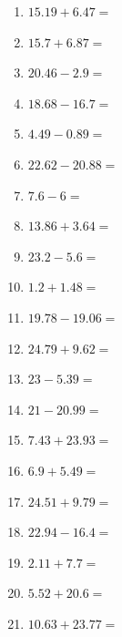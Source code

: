 \documentclass[12pt]{article}
\begin{document}
\begin{enumerate}
\item \large $ 15.19 + 6.47 = $ \vspace{1.5cm}
\newpage
\item \large $ 15.7 + 6.87 = $ \vspace{1.5cm}
\item \large $ 20.46 - 2.9 = $ \vspace{1.5cm}
\item \large $ 18.68 - 16.7 = $ \vspace{1.5cm}
\item \large $ 4.49 - 0.89 = $ \vspace{1.5cm}
\item \large $ 22.62 - 20.88 = $ \vspace{1.5cm}
\item \large $ 7.6 - 6 = $ \vspace{1.5cm}
\item \large $ 13.86 + 3.64 = $ \vspace{1.5cm}
\item \large $ 23.2 - 5.6 = $ \vspace{1.5cm}
\item \large $ 1.2 + 1.48 = $ \vspace{1.5cm}
\item \large $ 19.78 - 19.06 = $ \vspace{1.5cm}
\newpage
\item \large $ 24.79 + 9.62 = $ \vspace{1.5cm}
\item \large $ 23 - 5.39 = $ \vspace{1.5cm}
\item \large $ 21 - 20.99 = $ \vspace{1.5cm}
\item \large $ 7.43 + 23.93 = $ \vspace{1.5cm}
\item \large $ 6.9 + 5.49 = $ \vspace{1.5cm}
\item \large $ 24.51 + 9.79 = $ \vspace{1.5cm}
\item \large $ 22.94 - 16.4 = $ \vspace{1.5cm}
\item \large $ 2.11 + 7.7 = $ \vspace{1.5cm}
\item \large $ 5.52 + 20.6 = $ \vspace{1.5cm}
\item \large $ 10.63 + 23.77 = $ \vspace{1.5cm}

\end{enumerate}
\end{document}
